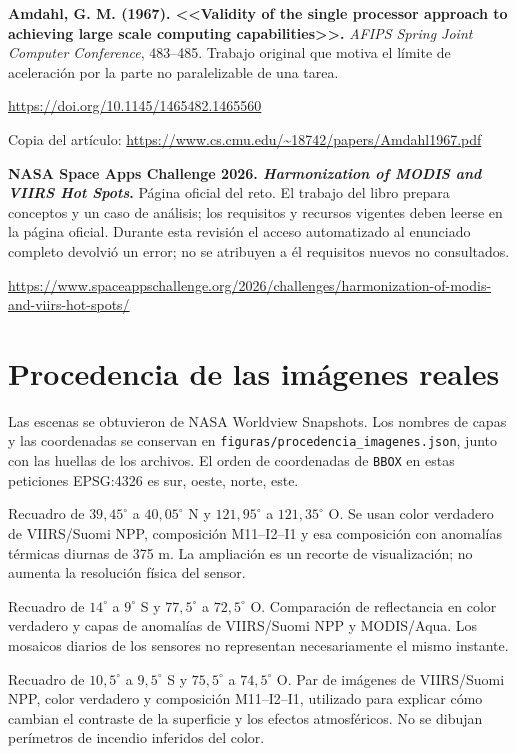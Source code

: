 \begin{enumerate}[label={[\arabic*]},ref=\arabic*,leftmargin=2.2em,itemsep=1em]
\item\label{src:amdahl} \textbf{Amdahl, G. M. (1967). <<Validity of the single processor
approach to achieving large scale computing capabilities>>.}
\emph{AFIPS Spring Joint Computer Conference}, 483--485. Trabajo original que motiva
el límite de aceleración por la parte no paralelizable de una tarea.
\par\url{https://doi.org/10.1145/1465482.1465560}
\par Copia del artículo: \url{https://www.cs.cmu.edu/~18742/papers/Amdahl1967.pdf}

\item\label{src:spaceapps} \textbf{NASA Space Apps Challenge 2026.
\emph{Harmonization of MODIS and VIIRS Hot Spots}.} Página oficial del reto. El trabajo
del libro prepara conceptos y un caso de análisis; los requisitos y recursos vigentes
deben leerse en la página oficial. Durante esta revisión el acceso automatizado al
enunciado completo devolvió un error; no se atribuyen a él requisitos nuevos no consultados.
\par\url{https://www.spaceappschallenge.org/2026/challenges/harmonization-of-modis-and-viirs-hot-spots/}
\end{enumerate}

\section{Procedencia de las imágenes reales}

Las escenas se obtuvieron de NASA Worldview Snapshots. Los nombres de capas y las
coordenadas se conservan en \texttt{figuras/procedencia\_imagenes.json}, junto con las
huellas de los archivos. El orden de coordenadas de \texttt{BBOX} en estas peticiones
EPSG:4326 es sur, oeste, norte, este.

\begin{description}[style=nextline,leftmargin=1.2em]
\item[Camp Fire, California, 9 de noviembre de 2018.]
Recuadro de $39{,}45^\circ$ a $40{,}05^\circ$ N y $121{,}95^\circ$ a $121{,}35^\circ$ O.
Se usan color verdadero de VIIRS/Suomi NPP, composición M11--I2--I1 y esa composición
con anomalías térmicas diurnas de 375 m. La ampliación es un recorte de visualización;
no aumenta la resolución física del sensor.
\item[Centro de Perú, 15 de septiembre de 2024.]
Recuadro de $14^\circ$ a $9^\circ$ S y $77{,}5^\circ$ a $72{,}5^\circ$ O. Comparación
de reflectancia en color verdadero y capas de anomalías de VIIRS/Suomi NPP y MODIS/Aqua.
Los mosaicos diarios de los sensores no representan necesariamente el mismo instante.
\item[Selva central peruana, 15 de septiembre de 2024.]
Recuadro de $10{,}5^\circ$ a $9{,}5^\circ$ S y $75{,}5^\circ$ a $74{,}5^\circ$ O.
Par de imágenes de VIIRS/Suomi NPP, color verdadero y composición M11--I2--I1, utilizado
para explicar cómo cambian el contraste de la superficie y los efectos atmosféricos.
No se dibujan perímetros de incendio inferidos del color.
\end{description}

